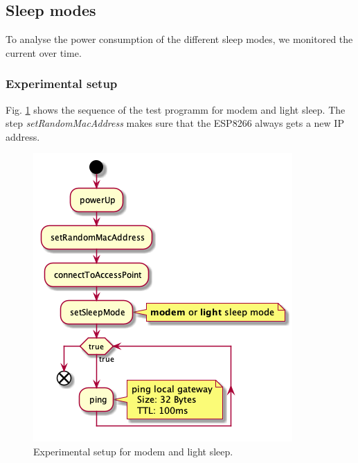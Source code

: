 \subsection{Sleep modes}
To analyse the power consumption of the different sleep modes,
we monitored the current over time.\\

\subsubsection{Experimental setup}
Fig. \ref{fig:experiment_modem_light_sleep} shows the sequence of the test programm for modem and light sleep.
The step \textit{setRandomMacAddress} makes sure that the ESP8266 always gets a new IP address.

\begin{figure}[h]
    \centering
    \includegraphics[width = 0.7 \linewidth]{fig/sequence_modem_light_sleep.png}
    \caption{Experimental setup for modem and light sleep.}
    \label{fig:experiment_modem_light_sleep}
\end{figure}

